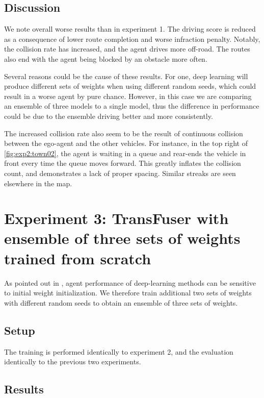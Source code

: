 \subsection{Discussion}

We note overall worse results than in experiment 1.
The driving score is reduced as a consequence of lower route completion and worse infraction penalty.
Notably, the collision rate has increased,
and the agent drives more off-road.
The routes also end with the agent being blocked by an obstacle more often. 

Several reasons could be the cause of these results.
For one, deep learning will produce different sets of weights when using different random seeds,
which could result in a worse agent by pure chance.
However, in this case we are comparing an ensemble of three models to a single model,
thus the difference in performance could be due to the ensemble driving better and more consistently.

The increased collision rate also seem to be the result of continuous collision between the ego-agent and the other vehicles.
For instance, in the top right of \cref{fig:exp2:town02},
the agent is waiting in a queue and rear-ends the vehicle in front
every time the queue moves forward.
This greatly inflates the collision count,
and demonstrates a lack of proper spacing.
Similar streaks are seen elsewhere in the map.


\section{Experiment 3: TransFuser with ensemble of three sets of weights trained from scratch}
\label{sec:exp3}
As pointed out in \cite{transfuser-pami},
agent performance of deep-learning methods can be sensitive to initial weight initialization.
We therefore train additional two sets of weights with different random seeds to obtain an ensemble of three sets of weights.

\subsection{Setup}
The training is performed identically to experiment 2,
and the evaluation identically to the previous two experiments.


\subsection{Results}

